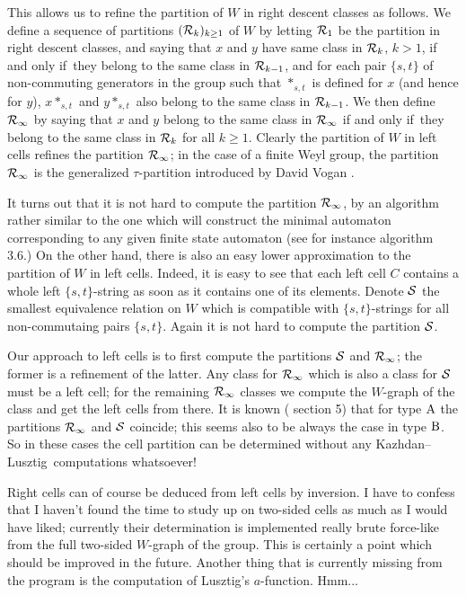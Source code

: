 \documentclass[11pt]{article}
\renewcommand{\iff}{if and only if}
\newcommand{\kl}{Kazh\-dan--Lusz\-tig}
\newcommand{\Rc}{{\cal R}}
\newcommand{\Sc}{{\cal S}}
\begin{document}
This allows us to refine the partition of $W$ in right descent classes as
follows. We define a sequence of partitions $(\Rc_k)_{k\geq 1}$ of $W$ by
letting $\Rc_1$ be the partition in right descent classes, and saying that
$x$ and $y$ have same class in $\Rc_k$, $k>1$, \iff\ they belong to the same 
class in $\Rc_{k-1}$, and for each pair $\{s,t\}$ of non-commuting generators 
in the group such that $*_{s,t}$ is defined for $x$ (and hence for $y$),
$x*_{s,t}$ and $y*_{s,t}$ also belong to the same class in $\Rc_{k-1}$. We
then define $\Rc_\infty$ by saying that $x$ and $y$ belong to the same class
in $\Rc_\infty$ \iff\ they belong to the same class in $\Rc_k$ for all 
$k\geq1$. Clearly the partition of $W$ in left cells refines the partition 
$\Rc_\infty$; in the case of a finite Weyl group, the partition $\Rc_\infty$ is
the generalized $\tau$-partition introduced by David Vogan \cite{vogan:1979}.

It turns out that it is not hard to compute the partition $\Rc_\infty$, by
an algorithm rather similar to the one which will construct the minimal
automaton corresponding to any given finite state automaton (see for
instance \cite{aho_seti_ullman:1986} algorithm 3.6.) On the other hand,
there is also an easy lower approximation to the partition of $W$ in left
cells. Indeed, it is easy to see that each left cell $C$ contains a whole left
$\{s,t\}$-string as soon as it contains one of its elements. Denote $\Sc$ the 
smallest equivalence relation on $W$ which is compatible with $\{s,t\}$-strings
for all non-commutaing pairs $\{s,t\}$. Again it is not hard to compute the
partition $\Sc$.

Our approach to left cells is to first compute the partitions $\Sc$ and 
$\Rc_\infty$; the former is a refinement of the latter. Any class for 
$\Rc_\infty$ which is also a class for $\Sc$ must be a left cell; for the
remaining $\Rc_\infty$ classes we compute the $W$-graph of the class and
get the left cells from there. It is known (\cite{kl:1979} section 5) that
for type ${\rm A}$ the partitions $\Rc_\infty$ and $\Sc$ coincide; this seems 
also to be always the case in type ${\rm B}$. So in these cases the cell
partition can be determined without any \kl\ computations whatsoever!

Right cells can of course be deduced from left cells by inversion. I have to
confess that I haven't found the time to study up on two-sided cells as much
as I would have liked; currently their determination is implemented really
brute force-like from the full two-sided $W$-graph of the group. This is
certainly a point which should be improved in the future. Another thing that
is currently missing from the program is the computation of Lusztig's 
$a$-function. Hmm...
\end{document}
